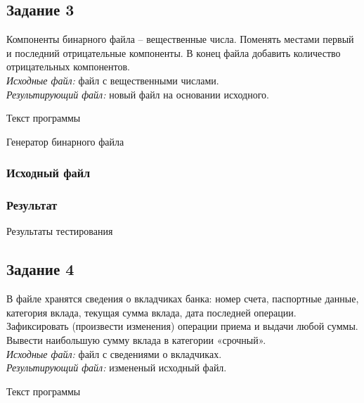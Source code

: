 \documentclass[a4paper,14pt]{extarticle}
\begin{document}
\subsection{Задание 3}
Компоненты бинарного файла – вещественные числа. Поменять местами первый и последний отрицательные компоненты. В конец файла добавить количество отрицательных компонентов.\\
\textit{Исходные файл:} файл с вещественными числами.\\
\textit{Результирующий файл:} новый файл на основании исходного.\\

\begin{center}
Текст программы
\end{center}
\vspace{0.3cm}

\begin{center}
Генератор бинарного файла
\end{center}
\vspace{0.6cm}
\subsubsection{Исходный файл}

\subsubsection{Результат}

\vspace{0.3cm}
\begin{center}
  Результаты тестирования
\end{center}

\subsection{Задание 4}
В файле хранятся сведения о вкладчиках банка: номер счета, паспортные данные, категория вклада, текущая сумма вклада, дата последней операции. Зафиксировать (произвести изменения) операции приема и выдачи любой суммы. Вывести наибольшую сумму вклада в категории «срочный».\\
\textit{Исходные файл:} файл с сведениями о вкладчиках.\\
\textit{Результирующий файл:} измененый исходный файл.\\

\begin{center}
Текст программы\\
\vspace{0.6cm}
\end{center}
\end{document}
